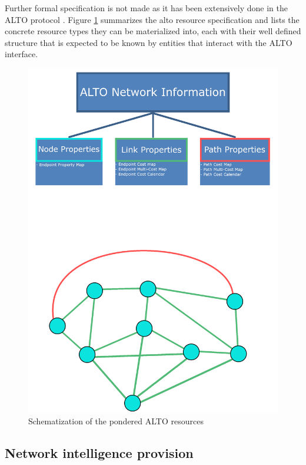 \documentclass[
  oneside,
  11pt, a4paper,
  footinclude=true,
  headinclude=true,
  cleardoublepage=empty
]{scrbook}
\begin{document}
    
    Further formal specification is not made as it has been extensively done in the ALTO protocol \cite{alto-protocol}. Figure \ref{fig:alto-resources} summarizes the alto resource specification and lists the concrete resource types they can be materialized into, each with their well defined structure that is expected to be known by entities that interact with the ALTO interface.  
    
	\begin{figure}[!h]
    \centering
    \includegraphics[scale=0.80]{img/architecture-resources.png}
    \caption{Schematization of the pondered ALTO resources}
    \label{fig:alto-resources}
    \end{figure}
    
    \subsection{Network intelligence provision}
    
\end{document}
